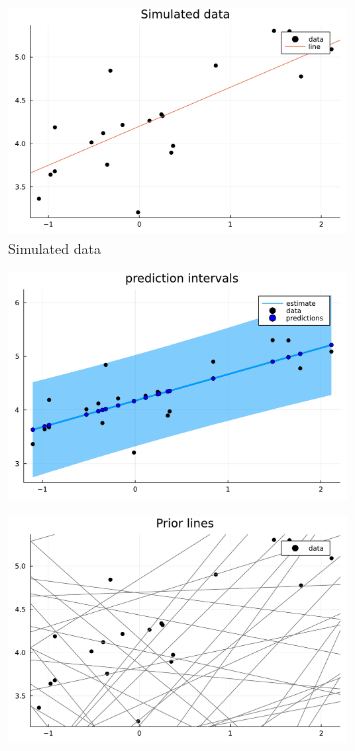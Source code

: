 \documentclass[aspectratio=169,xcolor=svgnames]{beamer}
\begin{document}
\begin{frame}
\begin{figure}[ht]
  \centering
  \includegraphics[width=0.8\textwidth]{figures/linear_data.pdf}
  \caption{\label{fig:label} Simulated data}
\end{figure}
\end{frame}

\begin{frame}
  \begin{figure}[ht]
    \centering
    \includegraphics[width=0.8\textwidth]{figures/linear_prediction_interval.pdf}
    \caption{\label{fig:label} }
  \end{figure}
\end{frame}

\begin{frame}
  \begin{figure}[ht]
    \centering
    \includegraphics[width=0.8\textwidth]{figures/linear_prior_lines.pdf}
    \caption{\label{fig:label} }
  \end{figure}
\end{frame}
\end{document}
